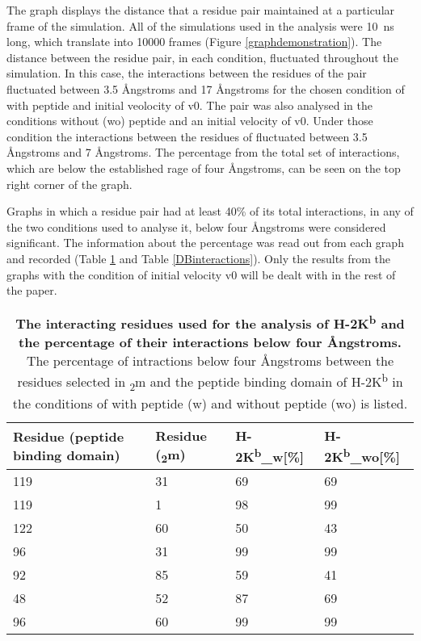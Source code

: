 \documentclass[11pt,twocolumn]{article}
\newcommand{\kb}{H-2K\textsuperscript{b}\xspace}
\newcommand{\kbw}{H-2K\textsuperscript{b}\_w\xspace}
\newcommand{\kbwo}{H-2K\textsuperscript{b}\_wo\xspace}
\newcommand{\angstr}{{\AA}ngstroms\xspace}
\newcommand{\btm}{\textbeta\textsubscript{2}m\xspace}
\begin{document}
The graph displays the distance that a residue pair maintained at a particular frame of the simulation. All of the simulations used in the analysis were \SI{10}{\nano\second} long, which translate into 10000 frames (Figure \ref{graphdemonstration}). The distance between the residue pair, in each condition, fluctuated throughout the simulation. In this case, the interactions between the residues of the pair fluctuated between 3.5 \angstr and  17 \angstr for the chosen condition of with peptide and initial veolocity of v0. The pair was also analysed in the conditions without (wo) peptide and an initial velocity of v0. Under those condition the interactions between the residues of  fluctuated between 3.5 \angstr and  7 \angstr.
The percentage from the total set of interactions, which are below the established rage of four \angstr, can be seen on the top right corner of the graph. 

Graphs in which a residue pair had at least 40\% of its total interactions, in any of the two conditions used to analyse it, below four \angstr were considered significant. The information about the percentage was read out from each graph and recorded (Table \ref{KBinteractions} and Table \ref{DBinteractions}). Only the results from the graphs with the condition of initial velocity v0 will be dealt with in the rest of the paper.


\begin{table}[H]
\caption{\textbf{The interacting residues used for the analysis of \kb and the percentage of their interactions below four \angstr. } The percentage of intractions below four \angstr between the residues selected in \btm and the peptide binding domain of \kb in the conditions of with peptide (w) and without peptide (wo) is listed.}
\label{KBinteractions}
\begin{tabularx}{\linewidth}{|X|X|X|X|}  \hline
Residue (peptide binding domain) &Residue (\btm)&\kbw [\%]&\kbwo [\%]\\ \hline
119&31&69&69\\ \hline
119&1&98&99\\ \hline
122&60&50&43\\ \hline
96&31&99&99\\ \hline
92&85&59&41\\ \hline
48&52&87&69\\ \hline
96&60&99&99\\ \hline
\end{tabularx}
\end{table}
\end{document}
